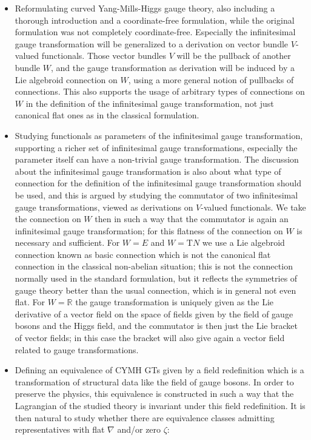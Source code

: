 \documentclass[a4paper,twoside,11pt]{scrbook}
\theoremstyle{plain}
\theoremstyle{remark}
\theoremstyle{definition}
\begin{document}
\begin{itemize}
	\item Reformulating curved Yang-Mills-Higgs gauge theory, also including a thorough introduction and a coordinate-free formulation, while the original formulation was not completely coordinate-free. Especially the infinitesimal gauge transformation will be generalized to a derivation on vector bundle $V$-valued functionals. Those vector bundles $V$ will be the pullback of another bundle $W$, and the gauge transformation as derivation will be induced by a Lie algebroid connection on $W$, using a more general notion of pullbacks of connections. This also supports the usage of arbitrary types of connections on $W$ in the definition of the infinitesimal gauge transformation, not just canonical flat ones as in the classical formulation.
	\item Studying functionals as parameters of the infinitesimal gauge transformation, supporting a richer set of infinitesimal gauge transformations, especially the parameter itself can have a non-trivial gauge transformation. The discussion about the infinitesimal gauge transformation is also about what type of connection for the definition of the infinitesimal gauge transformation should be used, and this is argued by studying the commutator of two infinitesimal gauge transformations, viewed as derivations on $V$-valued functionals. We take the connection on $W$ then in such a way that the commutator is again an infinitesimal gauge transformation; for this flatness of the connection on $W$ is necessary and sufficient. For $W= E$ and $ W = \mathrm{T}N$ we use a Lie algebroid connection known as basic connection which is not the canonical flat connection in the classical non-abelian situation; this is not the connection normally used in the standard formulation, but it reflects the symmetries of gauge theory better than the usual connection, which is in general not even flat. For $W = \mathbb{R}$ the gauge transformation is uniquely given as the Lie derivative of a vector field on the space of fields given by the field of gauge bosons and the Higgs field, and the commutator is then just the Lie bracket of vector fields; in this case the bracket will also give again a vector field related to gauge transformations.
	\item Defining an equivalence of CYMH GTs given by a field redefinition which is a transformation of structural data like the field of gauge bosons. In order to preserve the physics, this equivalence is constructed in such a way that the Lagrangian of the studied theory is invariant under this field redefinition. It is then natural to study whether there are equivalence classes admitting representatives with flat $\nabla$ and/or zero $\zeta$:

\end{itemize}
\end{document}
